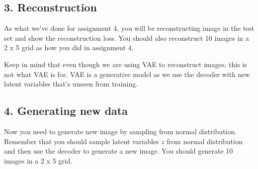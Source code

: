 \documentclass{article}
\begin{document}
\subsection*{3. Reconstruction}
As what we've done for assignment 4, you will be reconstructing image in the test set and show the reconstruction loss. You should also reconstruct 10 images in a 2 x 5 grid as how you did in assignment 4.

Keep in mind that even though we are using VAE to reconstruct images, this is not what VAE is for. VAE is a generative model as we use the decoder with new latent variables that's unseen from training.

\subsection*{4. Generating new data}
Now you need to generate new image by sampling from normal distribution. Remember that you should sample  latent variables $z$ from normal distribution and then use the decoder to generate a new image. You should generate 10 images in a 2 x 5 grid.
\end{document}
